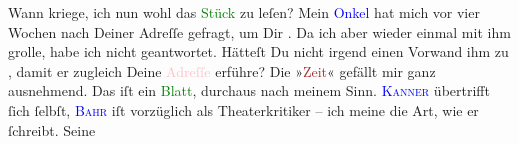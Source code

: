            \pstart
           Wann kriege, ich nun wohl das \textcolor{green}{Stück}{} zu leſen?\pend
           \pstart
           Mein \strikeout{\textcolor{gray}{Onk}}{ }\textcolor{blue}{Onkel}{} hat mich vor vier
               Wochen nach Deiner Adreſſe gefragt, um Dir \label{K_L02620_6v}\label{K_L02620_6h}. Da ich aber wieder einmal mit ihm grolle, habe ich nicht geantwortet.
               Hätteſt Du nicht irgend einen Vorwand ihm zu \label{K_L02620_7v}\label{K_L02620_7h}{ }, damit er zugleich {\pb}Deine \textcolor{pink}{Adreſſe}{} erführe?\pend
           \pstart
           Die »\textcolor{brown}{Zeit}{}\ledrightnote{\textcolor{brown}{Die Zeit. Wiener Wochenschrift}}« gefällt mir ganz ausnehmend. Das iſt
               ein \textcolor{green}{Blatt}{}, durchaus nach
               meinem Sinn. \textsc{\textcolor{blue}{Kanner}{}\ledrightnote{\textcolor{blue}{Heinrich Kanner}}} übertrifft ſich ſelbſt, \textsc{\textcolor{blue}{Bahr}{}\ledrightnote{\textcolor{blue}{Hermann Bahr}}} iſt vorzüglich als Theaterkritiker – ich meine die Art, wie er ſchreibt. Seine

